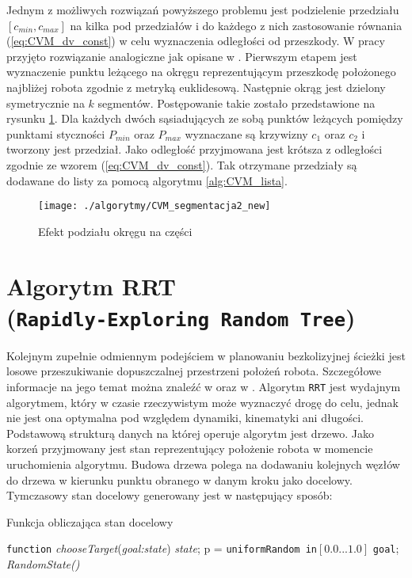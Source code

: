 	Jednym z możliwych rozwiązań powyższego problemu jest podzielenie przedziału $[c_{min},c_{max}]$ na kilka
	pod przedziałów i do każdego z nich zastosowanie równania (\ref{eq:CVM_dv_const}) w celu wyznaczenia odległości od przeszkody. W pracy przyjęto rozwiązanie analogiczne jak opisane w \cite{majchrowski}.
	Pierwszym etapem jest wyznaczenie punktu leżącego na okręgu reprezentującym przeszkodę położonego najbliżej robota zgodnie z  metryką euklidesową. Następnie okrąg jest dzielony symetrycznie na $k$  segmentów. Postępowanie takie zostało przedstawione na rysunku \ref{fig:CVM_segmentacja2}. 
	Dla każdych dwóch sąsiadujących ze sobą punktów leżących pomiędzy punktami styczności $P_{min}$ oraz $P_{max}$
 	wyznaczane są krzywizny $c_1$ oraz $c_2$ i tworzony jest przedział. Jako odległość przyjmowana jest krótsza 
	z odległości zgodnie ze wzorem (\ref{eq:CVM_dv_const}). Tak otrzymane przedziały są dodawane do listy za pomocą algorytmu \ref{alg:CVM_lista}.
	
	\begin{figure}[H]
	\centering
	\texttt{[image: ./algorytmy/CVM\_segmentacja2\_new]}
	\caption{ Efekt podziału okręgu na części} \label{fig:CVM_segmentacja2}
	\end{figure} 
\section{Algorytm RRT\\(\texttt{Rapidly-Exploring Random Tree}) \label{sec:RRT:basic}}
Kolejnym zupełnie odmiennym podejściem w planowaniu bezkolizyjnej ścieżki jest losowe przeszukiwanie dopuszczalnej przestrzeni położeń robota. Szczegółowe informacje na
jego temat można znaleźć w \cite{RRT} oraz w \cite{RRT2}.
Algorytm \texttt{RRT} jest wydajnym algorytmem, który w czasie rzeczywistym może wyznaczyć drogę do celu, jednak nie jest ona optymalna pod względem dynamiki, kinematyki ani długości.
Podstawową strukturą danych na której operuje algorytm jest drzewo. Jako korzeń przyjmowany jest stan reprezentujący położenie robota w momencie uruchomienia algorytmu.
Budowa drzewa polega na dodawaniu kolejnych węzłów do drzewa w kierunku punktu obranego w danym kroku jako docelowy. Tymczasowy stan docelowy generowany jest w następujący sposób:
 \begin{algorithm}[H]
	
	\caption{ Funkcja obliczająca stan docelowy }
	\label{alg:chooseTarget}
	\begin{algorithmic}
	\STATE \texttt{function} \textit{chooseTarget}(\textit{goal:state}) \textit{state};
	\STATE p = \texttt{uniformRandom in}$[0.0 ...1.0]$
	  \RETURN  \texttt{goal};
	  \RETURN \textit{RandomState()}
	\ENDIF
	\end{algorithmic}
  \end{algorithm}

